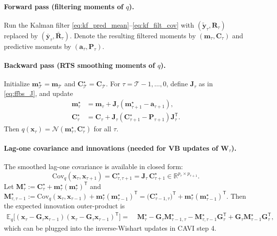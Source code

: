 \documentclass[11pt]{article}
\newcommand{\R}{\mathbb{R}}
\newcommand{\1}{\mathbb{I}}
\newcommand{\N}{\mathcal{N}}
\newcommand{\T}{\mathsf{T}}
\newcommand{\E}{\mathbb{E}}
\newcommand{\Cov}{\mathrm{Cov}}
\begin{document}
\paragraph{Forward pass (filtering moments of $q$).}
Run the Kalman filter \eqref{eq:kf_pred_mean}--\eqref{eq:kf_filt_cov} with
$(\tilde{\bm y}_\tau,\bm R_\tau)$ replaced by $(\bar{\bm y}_\tau,\bar{\bm R}_\tau)$.
Denote the resulting filtered moments by $(\bm m_\tau,\bm C_\tau)$ and predictive moments by $(\bm a_\tau,\bm P_\tau)$.

\paragraph{Backward pass (RTS smoothing moments of $q$).}
Initialize $\bm m_\mathcal{T}^\star=\bm m_\mathcal{T}$ and $\bm C_\mathcal{T}^\star=\bm C_\mathcal{T}$.
For $\tau=\mathcal{T}-1,\dots,0$, define $\bm J_\tau$ as in \eqref{eq:ffbs_J}, and update
\begin{align}
\bm m_\tau^\star &= \bm m_\tau + \bm J_\tau(\bm m_{\tau+1}^\star-\bm a_{\tau+1}), \label{eq:rts_mean}\\
\bm C_\tau^\star &= \bm C_\tau + \bm J_\tau(\bm C_{\tau+1}^\star-\bm P_{\tau+1})\bm J_\tau^\T. \label{eq:rts_cov}
\end{align}
Then $q(\bm x_\tau)=\N(\bm m_\tau^\star,\bm C_\tau^\star)$ for all $\tau$.

\paragraph{Lag-one covariance and innovations (needed for VB updates of $\bm W_\tau$).}
The smoothed lag-one covariance is available in closed form:
\begin{equation}
\Cov_q(\bm x_\tau,\bm x_{\tau+1})=\bm C_{\tau,\tau+1}^\star
=\bm J_\tau\,\bm C_{\tau+1}^\star
\in\R^{p_\tau\times p_{\tau+1}}.
\label{eq:rts_lag1_cov}
\end{equation}
Let $\bm M_\tau^\star:=\bm C_\tau^\star+\bm m_\tau^\star(\bm m_\tau^\star)^\T$ and
$\bm M_{\tau,\tau-1}^\star:=\Cov_q(\bm x_\tau,\bm x_{\tau-1})+\bm m_\tau^\star(\bm m_{\tau-1}^\star)^\T
=\big(\bm C_{\tau-1,\tau}^\star\big)^\T+\bm m_\tau^\star(\bm m_{\tau-1}^\star)^\T$.
Then the expected innovation outer-product is
\begin{align}
\E_q\!\Big[(\bm x_\tau-\bm G_\tau \bm x_{\tau-1})(\bm x_\tau-\bm G_\tau \bm x_{\tau-1})^\T\Big]
=\;&
\bm M_\tau^\star
-\bm G_\tau \bm M_{\tau-1,\tau}^\star
-\bm M_{\tau,\tau-1}^\star \bm G_\tau^\T
+\bm G_\tau \bm M_{\tau-1}^\star \bm G_\tau^\T,
\label{eq:vb_innov_second_moment}
\end{align}
which can be plugged into the inverse-Wishart updates in CAVI step 4.
\end{document}
